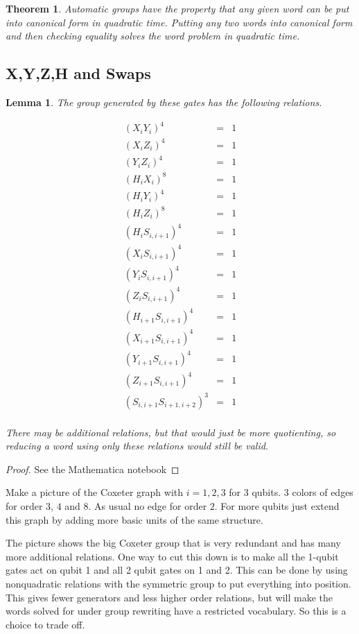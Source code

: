 \documentclass[11pt]{article}
\theoremstyle{change}
\newtheorem{theorem}[equation]{Theorem}
\newtheorem{lemma}[equation]{Lemma}
\theoremstyle{nonumberplain}
\newtheorem{proof}{Proof}
\numberwithin{equation}{section}
\begin{document}
\begin{theorem}
Automatic groups have the property that any given word can be put into canonical form in quadratic time. Putting any two words into canonical form and then checking equality solves the word problem in quadratic time.
\end{theorem}

\subsection{X,Y,Z,H and Swaps}

\begin{lemma}
The group generated by these gates has the following relations.

\begin{eqnarray*}
( X_i Y_i )^4 &=& 1\\
( X_i Z_i )^4 &=& 1\\
( Y_i Z_i )^4 &=& 1\\
( H_i X_i )^8 &=& 1\\
( H_i Y_i )^4 &=& 1\\
( H_i Z_i )^8 &=& 1\\
(H_i S_{i,i+1})^4 &=& 1\\
(X_i S_{i,i+1})^4 &=& 1\\
(Y_i S_{i,i+1})^4 &=& 1\\
(Z_i S_{i,i+1})^4 &=& 1\\
(H_{i+1} S_{i,i+1})^4 &=& 1\\
(X_{i+1} S_{i,i+1})^4 &=& 1\\
(Y_{i+1} S_{i,i+1})^4 &=& 1\\
(Z_{i+1} S_{i,i+1})^4 &=& 1\\
(S_{i,i+1} S_{i+1,i+2})^3 &=& 1\\
\end{eqnarray*}

There may be additional relations, but that would just be more quotienting, so reducing a word using only these relations would still be valid.
\end{lemma}

\begin{proof}
See the Mathematica notebook
\end{proof}

Make a picture of the Coxeter graph with $i=1,2,3$ for 3 qubits. 3 colors of edges for order $3$, $4$ and $8$. As usual no edge for order $2$. For more qubits just extend this graph by adding more basic units of the same structure.

The picture shows the big Coxeter group that is very redundant and has many more additional relations. One way to cut this down is to make all the 1-qubit gates act on qubit 1 and all 2 qubit gates on 1 and 2. This can be done by using nonquadratic relations with the symmetric group to put everything into position. This gives fewer generators and less higher order relations, but will make the words solved for under group rewriting have a restricted vocabulary. So this is a choice to trade off.
\end{document}
